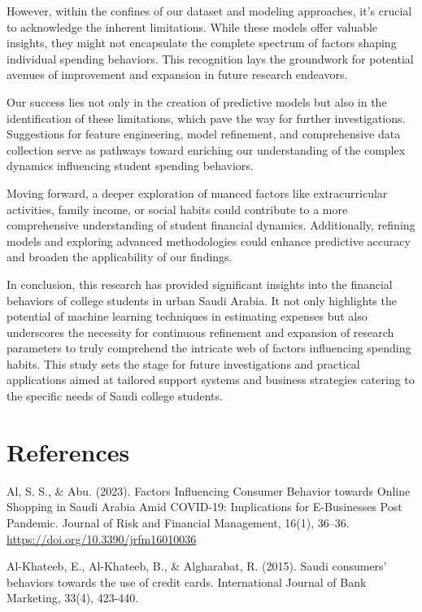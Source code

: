 \documentclass[
]{article}
\begin{document}
However, within the confines of our dataset and modeling approaches,
it's crucial to acknowledge the inherent limitations. While these models
offer valuable insights, they might not encapsulate the complete
spectrum of factors shaping individual spending behaviors. This
recognition lays the groundwork for potential avenues of improvement and
expansion in future research endeavors.

Our success lies not only in the creation of predictive models but also
in the identification of these limitations, which pave the way for
further investigations. Suggestions for feature engineering, model
refinement, and comprehensive data collection serve as pathways toward
enriching our understanding of the complex dynamics influencing student
spending behaviors.

Moving forward, a deeper exploration of nuanced factors like
extracurricular activities, family income, or social habits could
contribute to a more comprehensive understanding of student financial
dynamics. Additionally, refining models and exploring advanced
methodologies could enhance predictive accuracy and broaden the
applicability of our findings.

In conclusion, this research has provided significant insights into the
financial behaviors of college students in urban Saudi Arabia. It not
only highlights the potential of machine learning techniques in
estimating expenses but also underscores the necessity for continuous
refinement and expansion of research parameters to truly comprehend the
intricate web of factors influencing spending habits. This study sets
the stage for future investigations and practical applications aimed at
tailored support systems and business strategies catering to the
specific needs of Saudi college students.

\hypertarget{references}{%
\section{References}\label{references}}

Al, S. S., \& Abu. (2023). Factors Influencing Consumer Behavior towards
Online Shopping in Saudi Arabia Amid COVID-19: Implications for
E-Businesses Post Pandemic. Journal of Risk and Financial Management,
16(1), 36--36. \url{https://doi.org/10.3390/jrfm16010036}

Al-Khateeb, E., Al-Khateeb, B., \& Algharabat, R. (2015). Saudi
consumers' behaviors towards the use of credit cards. International
Journal of Bank Marketing, 33(4), 423-440.
\end{document}
